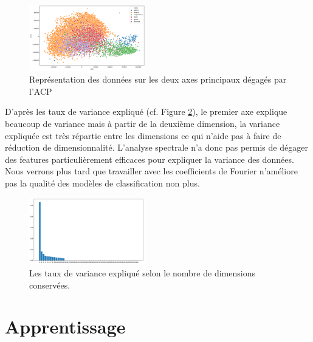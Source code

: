\documentclass[twocolumn,10pt]{article}
\begin{document}
\begin{figure}[htbp]
\begin{center}
\includegraphics[width=0.45\textwidth]{figures/acp_fourier.png}
\caption{\label{fig:acp_fourier} Représentation des données sur les deux axes principaux dégagés par l'ACP}
\end{center}
\end{figure}

D'après les taux de variance expliqué (cf. Figure \ref{fig:explained_variance_fourier}), le premier axe explique beaucoup de variance mais à partir de la deuxième dimension, la variance expliquée est très répartie entre les dimensions ce qui n'aide pas à faire de réduction de dimensionnalité. L'analyse spectrale n'a donc pas permis de dégager des features particulièrement efficaces pour expliquer la variance des données. Nous verrons plus tard que travailler avec les coefficients de Fourier n'améliore pas la qualité des modèles de classification non plus.

\begin{figure}[htbp]
\begin{center}
\includegraphics[width=0.45\textwidth]{figures/explained_variance_fourier.png}
\caption{\label{fig:explained_variance_fourier}Les taux de variance expliqué selon le nombre de dimensions conservées.}
\end{center}
\end{figure}





\section{Apprentissage} 
\end{document}
